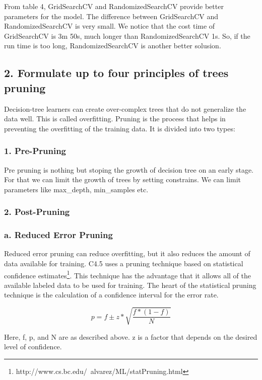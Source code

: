 \documentclass[UTF8]{ctexart}
\begin{document}
From table 4, GridSearchCV and RandomizedSearchCV provide better parameters for the model. The difference between GridSearchCV and RandomizedSearchCV is very small. We notice that the cost time of GridSearchCV is 3m 50s, much longer than RandomizedSearchCV 1s. So, if the run time is too long,  RandomizedSearchCV is another better solusion.

\subsection*{2. Formulate up to four principles of trees pruning}

Decision-tree learners can create over-complex trees that do not generalize the data well. This is called overfitting. Pruning is the process that helps in preventing the overfitting of the training data. It is divided into two types:

\subsubsection*{1. Pre-Pruning}

Pre pruning is nothing but stoping the growth of decision tree on an early stage. For that we can limit the growth of trees by setting constrains. We can limit parameters like max\_depth, min\_samples etc.

\subsubsection*{2. Post-Pruning}

\subsubsection*{a. Reduced Error Pruning}

Reduced error pruning can reduce overfitting, but it also reduces the amount of data available for training. C4.5 uses a pruning technique based on statistical confidence estimates\footnote{http://www.cs.bc.edu/~alvarez/ML/statPruning.html}. This technique has the advantage that it allows all of the available labeled data to be used for training. The heart of the statistical pruning technique is the calculation of a confidence interval for the error rate.

\begin{equation}
	p = f \pm z * \sqrt{\frac{f * (1 - f)}{N} }
\end{equation}

Here, f, p, and N are as described above. z is a factor that depends on the desired level of confidence.
\end{document}
